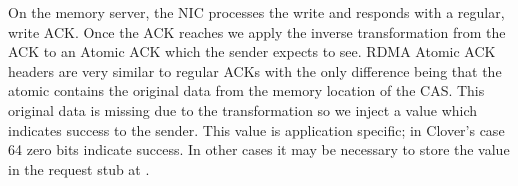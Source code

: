 On the memory server, the NIC processes the write and responds with a
regular, write ACK. Once the ACK reaches {\sword} we apply the
inverse transformation from the ACK to an Atomic ACK which the sender
expects to see.  RDMA Atomic ACK headers are very similar to regular
ACKs with the only difference being that the atomic contains the
original data from the memory location of the CAS. This original data
is missing due to the transformation so we inject a value which
indicates success to the sender.
This value is application specific; in Clover's case 64 zero bits
indicate success.  In other cases it may be necessary to store the
value in the request stub at {\sword}.



